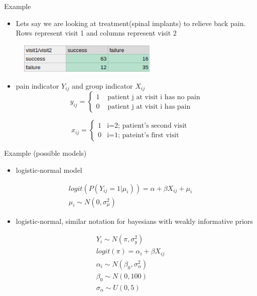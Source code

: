\documentclass[ignorenonframetext,]{beamer}
\providecommand{\tightlist}{%
  \setlength{\itemsep}{0pt}\setlength{\parskip}{0pt}}
\begin{document}
\begin{frame}{Example}

\begin{itemize}
\tightlist
\item
  Lets say we are looking at treatment(spinal implants) to relieve back
  pain. Rows represent visit 1 and columns represent visit 2
\end{itemize}

\begin{figure}
\centering
\includegraphics[width=2.60417in]{img6.png}
\caption{}
\end{figure}

\begin{itemize}
\tightlist
\item
  pain indicator \(Y_{ij}\) and group indicator \(X_{ij}\)
  \[y_{ij} = \begin{cases}
  1 & \text{ patient j at visit i has no pain} \\
  0 & \text{ patient j at visit i has pain}
   \end{cases}\]
\end{itemize}

\[x_{ij} = \begin{cases}
    1 & \text{i=2; patient's second visit} \\
    0 & \text{i=1; pateint's first visit}
 \end{cases}\]

\end{frame}

\begin{frame}{Example (possible models)}

\begin{itemize}
\tightlist
\item
  logistic-normal model
\end{itemize}

\[
\begin{aligned}
logit(P(Y_{ij}=1|\mu_i)) = \alpha + \beta X_{ij} + \mu_i \\
\mu_i \sim N(0, \sigma^2_{\mu})
\end{aligned}
\]

\begin{itemize}
\tightlist
\item
  logistic-normal, similar notation for bayesians with weakly
  informative priors
\end{itemize}

\[
\begin{aligned}
Y_i \sim N(\pi, \sigma^2_y) \\
logit(\pi) = \alpha_i + \beta X_{ij}\\
\alpha_i \sim N(\beta_0, \sigma^2_\alpha) \\
\beta_0 \sim N(0,100)\\
\sigma_\alpha \sim U(0,5)
\end{aligned}
\]

\end{frame}
\end{document}
